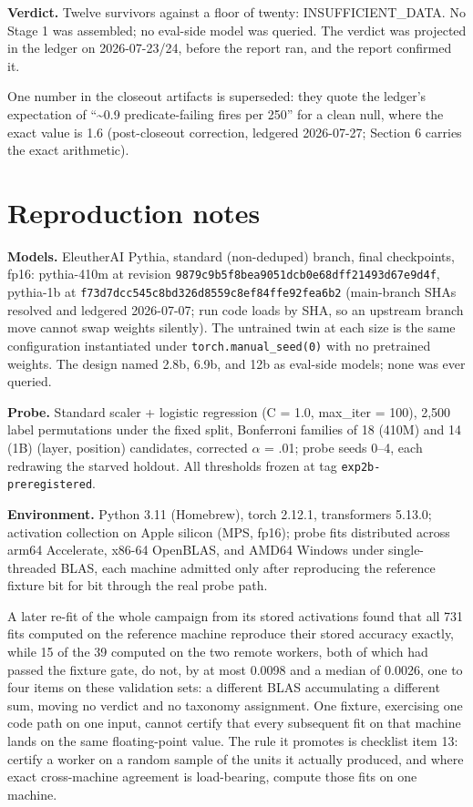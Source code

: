 \textbf{Verdict.} Twelve survivors against a floor of twenty:
INSUFFICIENT\_DATA. No Stage 1 was assembled; no eval-side model was
queried. The verdict was projected in the ledger on 2026-07-23/24,
before the report ran, and the report confirmed it.

One number in the closeout artifacts is superseded: they quote the
ledger's expectation of ``\textasciitilde0.9 predicate-failing fires per 250'' for a
clean null, where the exact value is 1.6 (post-closeout correction,
ledgered 2026-07-27; Section 6 carries the exact arithmetic).

\section{Reproduction notes}\label{appendix-c}

\textbf{Models.} EleutherAI Pythia, standard (non-deduped) branch, final
checkpoints, fp16: pythia-410m at revision
\texttt{9879c9b5f8bea9051dcb0e68dff21493d67e9d4f}, pythia-1b at
\texttt{f73d7dcc545c8bd326d8559c8ef84ffe92fea6b2} (main-branch SHAs resolved
and ledgered 2026-07-07; run code loads by SHA, so an upstream branch
move cannot swap weights silently). The untrained twin at each size is
the same configuration instantiated under \texttt{torch.manual\_seed(0)} with
no pretrained weights. The design named 2.8b, 6.9b, and 12b as
eval-side models; none was ever queried.

\textbf{Probe.} Standard scaler + logistic regression (C = 1.0, max\_iter =
100), 2,500 label permutations under the fixed split, Bonferroni
families of 18 (410M) and 14 (1B) (layer, position) candidates,
corrected $\alpha$ = .01; probe seeds 0--4, each redrawing the starved
holdout. All thresholds frozen at tag \texttt{exp2b-preregistered}.

\textbf{Environment.} Python 3.11 (Homebrew), torch 2.12.1, transformers
5.13.0; activation collection on Apple silicon (MPS, fp16); probe
fits distributed across arm64 Accelerate, x86-64 OpenBLAS, and AMD64
Windows under single-threaded BLAS, each machine admitted only after
reproducing the reference fixture bit for bit through the real probe
path.

A later re-fit of the whole campaign from its stored activations found
that all 731 fits computed on the reference machine reproduce their
stored accuracy exactly, while 15 of the 39 computed on the two remote
workers, both of which had passed the fixture gate, do not, by at most
0.0098 and a median of 0.0026, one to four items on these validation
sets: a different BLAS accumulating a different sum, moving no verdict
and no taxonomy assignment. One fixture, exercising one code path on
one input, cannot certify that every subsequent fit on that machine
lands on the same floating-point value. The rule it promotes is
checklist item 13: certify a worker on a random sample of the units it
actually produced, and where exact cross-machine agreement is
load-bearing, compute those fits on one machine.

